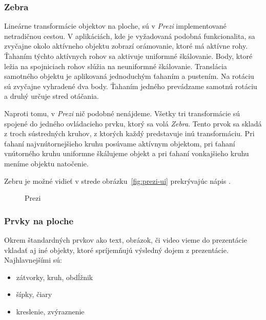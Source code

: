 \subsubsection{Zebra}

Lineárne transformácie objektov na ploche, sú v \textit{Prezi} implementované netradičnou cestou. V aplikáciách, kde je vyžadovaná podobná funkcionalita, sa zvyčajne okolo aktívneho objektu zobrazí orámovanie, ktoré má aktívne rohy. Ťahaním týchto aktívnych rohov sa aktivuje uniformné škálovanie. Body, ktoré ležia na spojniciach rohov slúžia na neuniformné škálovanie. Translácia samotného objektu je aplikovaná jednoduchým ťahaním a pustením. Na rotáciu sú zvyčajne vyhradené dva body. Ťahaním jedného prevádzame samotnú rotáciu a druhý určuje stred otáčania.

Naproti tomu, v \textit{Prezi} nič podobné nenájdeme. Všetky tri transformácie sú spojené do jedného ovládacieho prvku, ktorý sa volá \textit{Zebra}. Tento prvok sa skladá z troch sústredných kruhov, z ktorých každý predstavuje inú transformáciu. Pri ťahaní najvnútornejšieho kruhu posúvame aktívnym objektom, pri ťahaní vnútorného kruhu uniformne škálujeme objekt a pri ťahaní vonkajšieho kruhu meníme objektu natočenie.

Zebru je možné vidieť v strede obrázku~\ref{fig:prezi-ui} prekrývajúc nápis .

\begin{figure}
  \centering
  \caption{Prezi}
  \label{fig:prezi}
\end{figure}

\subsubsection{Prvky na ploche}

Okrem štandardných prvkov ako text, obrázok, či video vieme do prezentácie vkladať aj iné objekty, ktoré spríjemňujú výsledný dojem z prezentácie. Najhlavnejšími sú:

\begin{itemize}
 \item zátvorky, kruh, obdĺžnik
 \item šípky, čiary
 \item kreslenie, zvýraznenie
\end{itemize}


